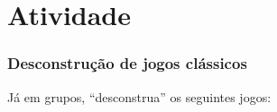 \expandafter\documentclass\expandafter[table, usenames, svgnames, dvipsnames, \classopts]{beamer}
\begin{document}
\begin{frame}
\begin{minipage}{\paperwidth}
	\end{minipage}
			
	
\end{frame}

\section{Atividade}

\begin{frame}
	\frametitle{\textbf{Desconstrução de jogos clássicos}}

	\vspace{-1.5em}

	\begin{center}
		Já em grupos, ``desconstrua'' os seguintes jogos:
	\end{center}
	
	\vspace{-1.5em}

	\begin{figure}
	    \centering


\end{figure}
\end{frame}
\end{document}
